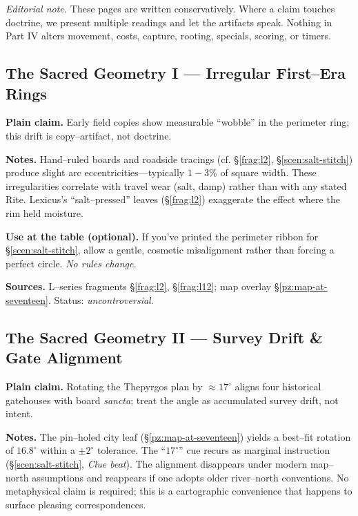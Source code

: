 \documentclass[11pt]{article}
\numberwithin{equation}{section} %
\theoremstyle{plain} %
\theoremstyle{definition} %
\theoremstyle{remark} %
\begin{document}
\medskip
\noindent\textit{Editorial note.} These pages are written conservatively. Where a claim touches doctrine, we present multiple readings and let the artifacts speak. Nothing in Part IV alters movement, costs, capture, rooting, specials, scoring, or timers.

\subsection{The Sacred Geometry I — Irregular First–Era Rings}
\label{geometry:irregular-rings}

\noindent\textbf{Plain claim.} Early field copies show measurable “wobble” in the perimeter ring; this drift is copy–artifact, not doctrine.

\medskip
\noindent\textbf{Notes.} Hand–ruled boards and roadside tracings (cf. \S\ref{frag:l2}, \S\ref{scen:salt-stitch}) produce slight arc eccentricities—typically \(1\!-\!3\%\) of square width. These irregularities correlate with travel wear (salt, damp) rather than with any stated Rite. Lexicus’s “salt–pressed” leaves (\S\ref{frag:l2}) exaggerate the effect where the rim held moisture.

\medskip
\noindent\textbf{Use at the table (optional).} If you’ve printed the perimeter ribbon for \S\ref{scen:salt-stitch}, allow a gentle, cosmetic misalignment rather than forcing a perfect circle. \emph{No rules change.}

\medskip
\noindent\textbf{Sources.} L–series fragments \S\ref{frag:l2}, \S\ref{frag:l12}; map overlay \S\ref{pz:map-at-seventeen}. Status: \emph{uncontroversial}.

\subsection{The Sacred Geometry II — Survey Drift \& Gate Alignment}
\label{geometry:survey-drift}

\noindent\textbf{Plain claim.} Rotating the Thepyrgos plan by \(\approx 17^\circ\) aligns four historical gatehouses with board \emph{sancta}; treat the angle as accumulated survey drift, not intent.

\medskip
\noindent\textbf{Notes.} The pin–holed city leaf (\S\ref{pz:map-at-seventeen}) yields a best–fit rotation of \(16.8^\circ\) within a \(\pm 2^\circ\) tolerance. The “\(17^\circ\)” cue recurs as marginal instruction (\S\ref{scen:salt-stitch}, \emph{Clue beat}). The alignment disappears under modern map–north assumptions and reappears if one adopts older river–north conventions. No metaphysical claim is required; this is a cartographic convenience that happens to surface pleasing correspondences.
\end{document}
